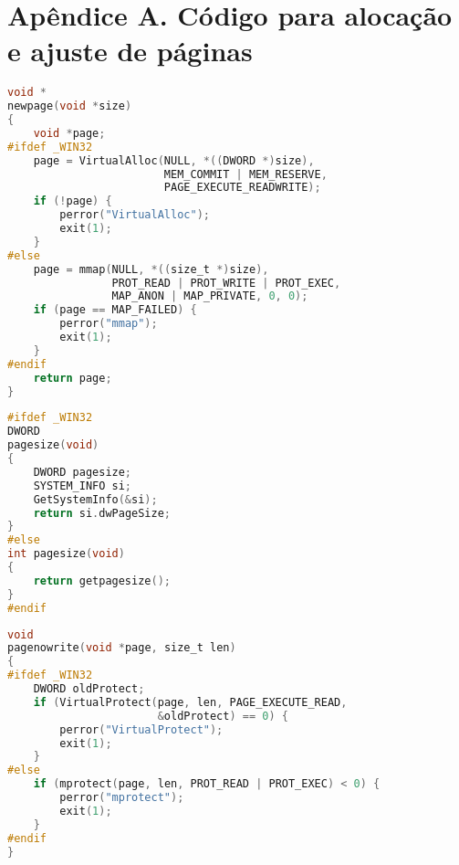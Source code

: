 \chapter*{Apêndice A. Código para alocação e ajuste de páginas}
\label{apendiceA}


\renewcommand\lstlistingname{Código}

\begin{lstlisting}[language=C, caption={Alocação de página(s) para o
    compilador JIT}, frame=tb]
void *
newpage(void *size)
{
    void *page;
#ifdef _WIN32
    page = VirtualAlloc(NULL, *((DWORD *)size),
                        MEM_COMMIT | MEM_RESERVE,
                        PAGE_EXECUTE_READWRITE);
    if (!page) {
        perror("VirtualAlloc");
        exit(1);
    }
#else
    page = mmap(NULL, *((size_t *)size),
                PROT_READ | PROT_WRITE | PROT_EXEC,
                MAP_ANON | MAP_PRIVATE, 0, 0);
    if (page == MAP_FAILED) {
        perror("mmap");
        exit(1);
    }
#endif
    return page;
}
\end{lstlisting}

\pagebreak

\begin{lstlisting}[language=C, caption={Tamanho, em bytes, de uma
    página}, frame=tb]
#ifdef _WIN32
DWORD
pagesize(void)
{
    DWORD pagesize;
    SYSTEM_INFO si;
    GetSystemInfo(&si);
    return si.dwPageSize;
}
#else
int pagesize(void)
{
    return getpagesize();
}
#endif
\end{lstlisting}


\begin{lstlisting}[language=C, caption={Remoção da permissão de
    escrita de uma ou mais páginas}, frame=tb]
void
pagenowrite(void *page, size_t len)
{
#ifdef _WIN32
    DWORD oldProtect;
    if (VirtualProtect(page, len, PAGE_EXECUTE_READ,
                       &oldProtect) == 0) {
        perror("VirtualProtect");
        exit(1);
    }
#else
    if (mprotect(page, len, PROT_READ | PROT_EXEC) < 0) {
        perror("mprotect");
        exit(1);
    }
#endif
}
\end{lstlisting}


